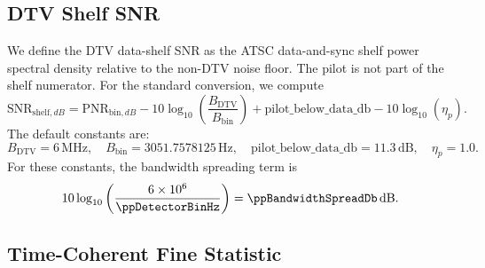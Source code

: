 \documentclass[10pt,letterpaper]{article}
\newcommand{\dB}{\,\mathrm{dB}}
\begin{document}
\subsection{DTV Shelf SNR}

We define the DTV data-shelf SNR as the ATSC data-and-sync shelf power spectral density relative to the non-DTV noise floor. The pilot is not part of the shelf numerator. For the standard conversion, we compute
\begin{equation}
  \boxed{\mathrm{SNR}_{\mathrm{shelf},dB}=
  \mathrm{PNR}_{\mathrm{bin},dB}
  -10\log_{10}\left(\frac{B_{\mathrm{DTV}}}{B_{\mathrm{bin}}}\right)
  +\mathrm{pilot\_below\_data\_db}
  -10\log_{10}(\eta_p).}
\end{equation}
The default constants are:
\begin{equation}
 B_{\mathrm{DTV}}=6\,\mathrm{MHz},\quad
 B_{\mathrm{bin}}=3051.7578125\,\mathrm{Hz},\quad
 \mathrm{pilot\_below\_data\_db}=11.3\dB,
 \quad \eta_p=1.0.
\end{equation}
For these constants, the bandwidth spreading term is
\begin{equation}
  10\log_{10}\left(\frac{6\times 10^6}{\ppDetectorBinHz}\right)=\ppBandwidthSpreadDb\dB.
\end{equation}

\subsection{Time-Coherent Fine Statistic}
\end{document}
